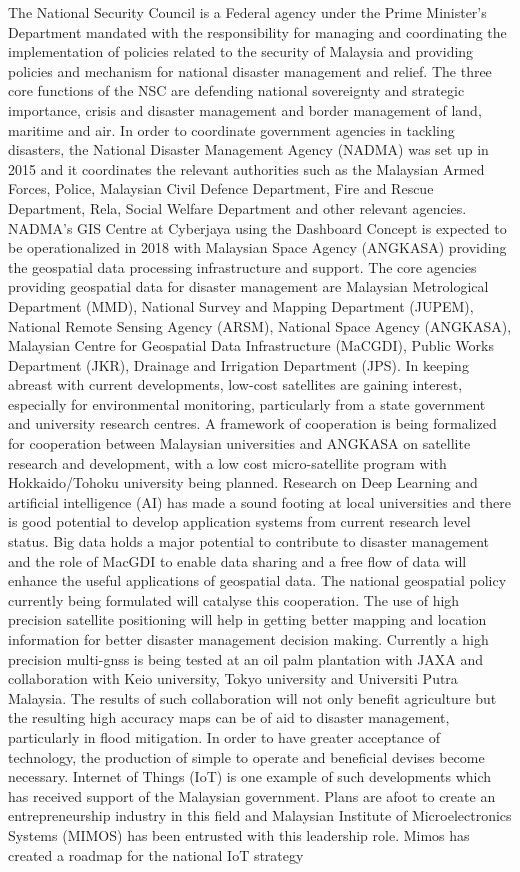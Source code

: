 {{The National Security Council is a Federal agency under the Prime Minister's Department mandated with the responsibility for managing and coordinating the implementation of policies related to the security of Malaysia and providing policies and mechanism for national disaster management and relief. The three core functions of the NSC are defending national sovereignty and strategic importance, crisis and disaster management and border management of land, maritime and air. In order to coordinate government agencies in tackling disasters, the National Disaster Management Agency (NADMA) was set up in 2015 and it coordinates the relevant authorities such as the Malaysian Armed Forces, Police, Malaysian Civil Defence Department, Fire and Rescue Department, Rela, Social Welfare Department and other relevant agencies. NADMA's GIS Centre at Cyberjaya  using the Dashboard Concept is expected to be operationalized in 2018 with Malaysian Space Agency (ANGKASA) providing the geospatial data processing infrastructure and support. The core agencies providing geospatial data for disaster management are Malaysian Metrological Department (MMD), National Survey and Mapping Department (JUPEM), National Remote Sensing Agency (ARSM), National Space Agency (ANGKASA), Malaysian Centre for Geospatial Data Infrastructure (MaCGDI), Public Works Department (JKR), Drainage and Irrigation Department (JPS). In keeping abreast with current developments, low-cost satellites are gaining interest, especially for environmental monitoring, particularly from a state government and university research centres. A framework of cooperation is being formalized for cooperation between Malaysian universities and ANGKASA  on satellite research and development, with a low cost micro-satellite program with Hokkaido/Tohoku university being planned. Research on Deep Learning and artificial intelligence (AI) has made a sound footing at local universities and there is good potential to develop application systems from current research level status. Big data holds a major potential to contribute to disaster management and the role of MacGDI to enable  data sharing and a free flow of data will enhance the useful applications of geospatial data. The national geospatial policy currently being formulated will catalyse this cooperation. The use of high precision satellite positioning will help in getting better mapping and location information for better disaster management decision making. Currently a high precision multi-gnss is being tested at an oil palm plantation with JAXA and collaboration with Keio university, Tokyo university and Universiti Putra Malaysia. The results of such collaboration will not only benefit agriculture but the resulting high accuracy maps can be of aid to disaster management, particularly in flood mitigation. In order to have greater acceptance of technology, the production of simple to operate and beneficial devises become necessary. Internet of Things (IoT) is one example of such developments which has received support of the Malaysian government. Plans are afoot to create an entrepreneurship industry in this field and Malaysian Institute of Microelectronics Systems (MIMOS) has been entrusted with this leadership role. Mimos has created a roadmap for the national IoT strategy }}
